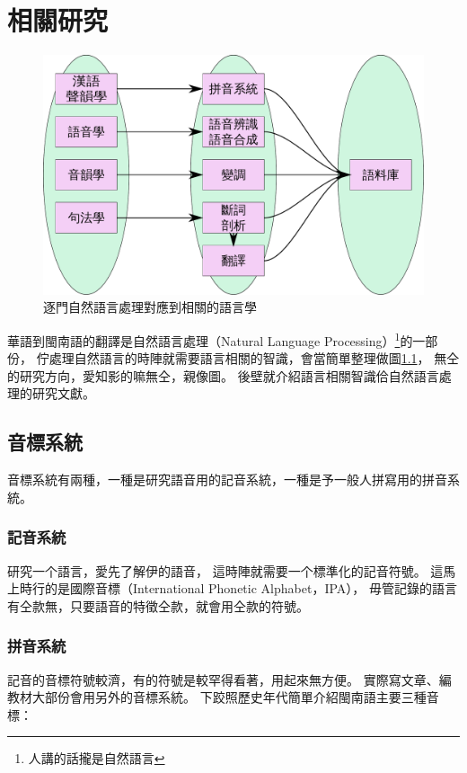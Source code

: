 \chapter{相關研究}
\label{章：相關研究}

\begin{figure}
\centerline{\includegraphics[keepaspectratio,width=40em]{圖/相關研究智識}}
\caption{逐門自然語言處理對應到相關的語言學}
\label{圖：相關研究智識}
\end{figure}


華語到閩南語的翻譯是自然語言處理（Natural Language Processing）\footnote{人講的話攏是自然語言}的一部份，
佇處理自然語言的時陣就需要語言相關的智識，會當簡單整理做圖\ref{圖：相關研究智識}，
無仝的研究方向，愛知影的嘛無仝，親像圖。
後壁就介紹語言相關智識佮自然語言處理的研究文獻。

\section{音標系統}
\label{節：音標系統}
音標系統有兩種，一種是研究語音用的記音系統，一種是予一般人拼寫用的拼音系統。

\subsection{記音系統}
\label{小節：記音系統}
研究一个語言，愛先了解伊的語音，
這時陣就需要一个標準化的記音符號。
這馬上時行的是國際音標（International Phonetic Alphabet，IPA）\cite{WIKI國際音標}，
毋管記錄的語言有仝款無，只要語音的特徵仝款，就會用仝款的符號。

\subsection{拼音系統}
\label{小節：拼音系統}
記音的音標符號較濟，有的符號是較罕得看著，用起來無方便。
實際寫文章、編教材大部份會用另外的音標系統。
下跤照歷史年代簡單介紹閩南語主要三種音標：

